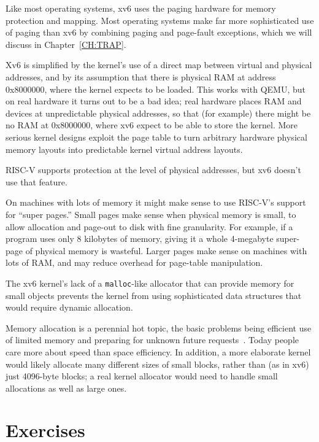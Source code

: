Like most operating systems, xv6 uses the paging hardware for memory
protection and mapping.  Most operating systems make far more
sophisticated use of paging than xv6 by combining paging and
page-fault exceptions, which we will discuss in
Chapter~\ref{CH:TRAP}.

Xv6 is simplified by the kernel's use of a direct map between virtual
and physical addresses, and by its assumption that there is physical
RAM at address 0x8000000, where the kernel expects to be loaded. This
works with QEMU, but on real hardware it turns out to be a bad idea;
real hardware places RAM and devices at unpredictable physical
addresses, so that (for example) there might be no RAM at 0x8000000,
where xv6 expect to be able to store the kernel. More serious kernel
designs exploit the page table to turn arbitrary hardware physical
memory layouts into predictable kernel virtual address layouts.

RISC-V supports protection at the level of physical addresses,
but xv6 doesn't use that feature.

On machines with lots of memory
it might make sense to use
RISC-V's support for ``super pages.''
Small pages make sense
when physical memory is small, to allow allocation and page-out to disk
with fine granularity.
For example, if a program
uses only 8 kilobytes of memory, giving it a whole 4-megabyte super-page
of physical memory is wasteful.
Larger pages make sense on machines with lots of RAM,
and may reduce overhead for page-table manipulation.

The xv6 kernel's lack of a {\tt malloc}-like allocator that can
provide memory for small objects prevents the kernel from using
sophisticated data structures that would require dynamic allocation.

Memory allocation is a perennial hot topic, the basic problems being
efficient use of limited memory and
preparing for unknown future requests~\cite{knuth}.  Today people care more about speed than
space efficiency.  In addition, a more elaborate kernel
would likely allocate many different sizes of small blocks,
rather than (as in xv6) just 4096-byte blocks;
a real kernel
allocator would need to handle small allocations as well as large
ones.
\section{Exercises}

